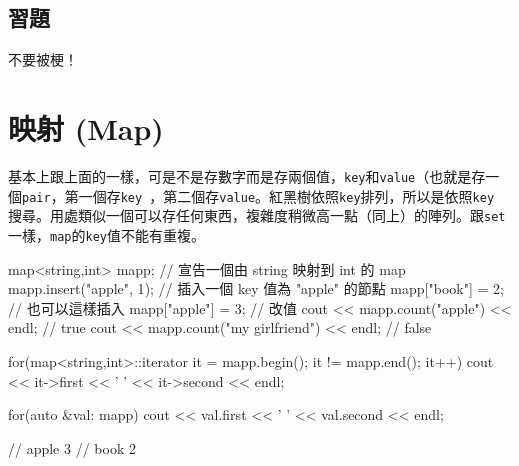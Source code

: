 \documentclass[main.tex]{subfiles}
\begin{document}
\subsection{習題}
不要被梗！
\section{映射 (Map)}
基本上跟上面的一樣，可是不是存數字而是存兩個值，\texttt{key}和\texttt{value}（也就是存一個\texttt{pair}，第一個存\texttt{key }，第二個存\texttt{value}。紅黑樹依照\texttt{key}排列，所以是依照\texttt{key }搜尋。用處類似一個可以存任何東西，複雜度稍微高一點（同上）的陣列。跟\texttt{set}一樣，\texttt{map}的\texttt{key}值不能有重複。
\begin{C++}
map<string,int> mapp;
// 宣告一個由 string 映射到 int 的 map
mapp.insert({"apple", 1});
// 插入一個 key 值為 "apple" 的節點
mapp["book"] = 2; // 也可以這樣插入
mapp["apple"] = 3; // 改值
cout << mapp.count("apple") << endl; // true
cout << mapp.count("my girlfriend") << endl; // false

for(map<string,int>::iterator it = mapp.begin(); it != mapp.end(); it++)
    cout << it->first << ' ' << it->second << endl;

for(auto &val: mapp)
    cout << val.first << ' ' << val.second << endl;

// apple 3
// book 2
\end{C++}
\end{document}
